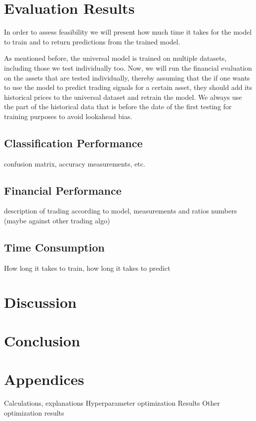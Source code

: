 \documentclass[11pt, a4paper]{article}
\begin{document}
\section{Evaluation Results}
\label{sec:ER}

In order to assess feasibility we will present how much time it takes for the model to train and to return predictions from the trained model. 

As mentioned before, the universal model is trained on multiple datasets, including those we test individually too. Now, we will run the financial evaluation on the assets that are tested individually, thereby assuming that the if one wants to use the model to predict trading signals for a certain asset, they should add its historical prices to the universal dataset and retrain the model.
We always use the part of the historical data that is before the date of the first testing for training purposes to avoid lookahead bias.

\subsection{Classification Performance}
\label{subsec:ER:ClassPerf}
confusion matrix, accuracy measurements, etc.

\subsection{Financial Performance}
\label{subsec:ER:FinPerf}
description of trading according to model, measurements and ratios
numbers (maybe against other trading algo)

\subsection{Time Consumption}
\label{subsec:ER:TimePerf}
How long it takes to train, how long it takes to predict

\section{Discussion}
\label{sec:Discuss}

\section{Conclusion}
\label{sec:Conclusion}

\section{Appendices}
\label{sec:App}
Calculations, explanations
Hyperparameter optimization Results
Other optimization results



\end{document}
